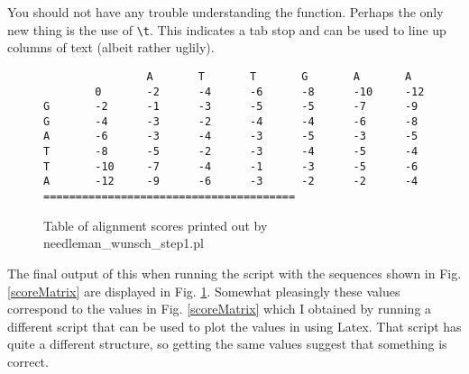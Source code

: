 \documentclass[11pt]{article}
\begin{document}
You should not have any trouble understanding the function. Perhaps the only
new thing is the use of \verb|\t|. This indicates a tab stop and can be used
to line up columns of text (albeit rather uglily).


\begin{figure}[ht]
\begin{verbatim}
                A       T       T       G       A       A                                                                                                                                            
        0       -2      -4      -6      -8      -10     -12                                                                                                                                          
G       -2      -1      -3      -5      -5      -7      -9                                                                                                                                           
G       -4      -3      -2      -4      -4      -6      -8                                                                                                                                           
A       -6      -3      -4      -3      -5      -3      -5                                                                                                                                           
T       -8      -5      -2      -3      -4      -5      -4                                                                                                                                           
T       -10     -7      -4      -1      -3      -5      -6                                                                                                                                           
A       -12     -9      -6      -3      -2      -2      -4                                                                                                                                           
=======================================  
\end{verbatim}
\caption{Table of alignment scores printed out by needleman\_wunsch\_step1.pl}
\label{s1Table}
\end{figure}
The final output of this when running the script with the sequences 
shown in Fig. \ref{scoreMatrix} are displayed in Fig. \ref{s1Table}.
Somewhat pleasingly these values correspond to the values in Fig. \ref{scoreMatrix} which I
obtained by running a different script that can be used to plot the values in
using Latex. That script has quite a different structure, so getting the same
values suggest that something is correct.
\end{document}
